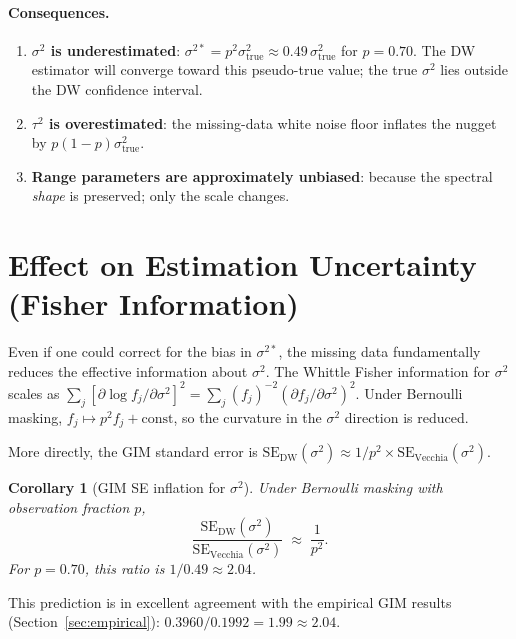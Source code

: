 \documentclass[12pt]{article}
\newtheorem{corollary}{Corollary}
\begin{document}
\paragraph{Consequences.}
\begin{enumerate}
  \item \textbf{$\sigma^2$ is underestimated}: $\sigma^{2*} = p^2\sigma^2_{\mathrm{true}}
        \approx 0.49\,\sigma^2_{\mathrm{true}}$ for $p=0.70$.
        The DW estimator will converge toward this pseudo-true value;
        the true $\sigma^2$ lies outside the DW confidence interval.
  \item \textbf{$\tau^2$ is overestimated}: the missing-data white noise
        floor inflates the nugget by $p(1-p)\sigma^2_{\mathrm{true}}$.
  \item \textbf{Range parameters are approximately unbiased}: because
        the spectral \emph{shape} is preserved; only the scale changes.
\end{enumerate}


\section{Effect on Estimation Uncertainty (Fisher Information)}

Even if one could correct for the bias in $\sigma^{2*}$, the missing
data fundamentally reduces the effective information about $\sigma^2$.
The Whittle Fisher information for $\sigma^2$ scales as
$\sum_j [\partial \log f_j / \partial \sigma^2]^2
= \sum_j (f_j)^{-2}(\partial f_j / \partial \sigma^2)^2$.
Under Bernoulli masking, $f_j \mapsto p^2 f_j + \text{const}$, so the
curvature in the $\sigma^2$ direction is reduced.

More directly, the GIM standard error is
$\mathrm{SE}_{\mathrm{DW}}(\sigma^2) \approx 1/p^2 \times
\mathrm{SE}_{\mathrm{Vecchia}}(\sigma^2)$.

\begin{corollary}[GIM SE inflation for $\sigma^2$]
\label{cor:se}
Under Bernoulli masking with observation fraction $p$,
\[
  \frac{\mathrm{SE}_{\mathrm{DW}}(\sigma^2)}{\mathrm{SE}_{\mathrm{Vecchia}}(\sigma^2)}
  \;\approx\; \frac{1}{p^2}.
\]
For $p = 0.70$, this ratio is $1/0.49 \approx 2.04$.
\end{corollary}

\noindent This prediction is in excellent agreement with the empirical
GIM results (Section~\ref{sec:empirical}):
$0.3960 / 0.1992 = 1.99 \approx 2.04$.
\end{document}
